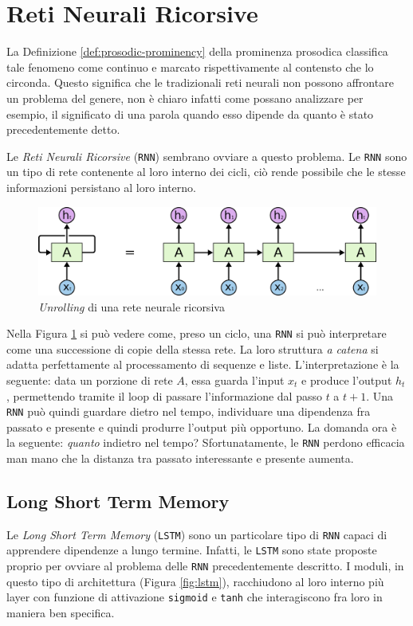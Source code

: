 \documentclass[twoside,twocolumn,11pt]{extarticle}
\theoremstyle{definition}
\begin{document}
\section{Reti Neurali Ricorsive}\label{sec:rnn}
	La Definizione \ref{def:prosodic-prominency} della prominenza prosodica classifica tale fenomeno come continuo e marcato rispettivamente al contensto che lo circonda. Questo significa che le tradizionali reti neurali non possono affrontare un problema del genere, non è chiaro infatti come possano analizzare per esempio, il significato di una parola quando esso dipende da quanto è stato precedentemente detto.
	
	Le \textit{Reti Neurali Ricorsive} (\texttt{RNN}) sembrano ovviare a questo problema. Le \texttt{RNN} sono un tipo di rete contenente al loro interno dei cicli, ciò rende possibile che le stesse informazioni persistano al loro interno.
	\begin{figure}[h]
		\centering
		\includegraphics[scale=.4]{img/rnn.png}
		\caption{\textit{Unrolling} di una rete neurale ricorsiva}
		\label{fig:unroll}
	\end{figure}
	Nella Figura \ref{fig:unroll} si può vedere come, preso un ciclo, una \texttt{RNN} si può interpretare come una successione di copie della stessa rete. La loro struttura \textit{a catena} si adatta perfettamente al processamento di sequenze e liste. L'interpretazione è la seguente: data un porzione di rete $A$, essa guarda l'input $x_t$ e produce l'output $h_t$, permettendo tramite il loop di passare l'informazione dal passo $t$ a $t + 1$. Una \texttt{RNN} può quindi guardare dietro nel tempo, individuare una dipendenza fra passato e presente e quindi produrre l'output più opportuno. La domanda ora è la seguente: \textit{quanto} indietro nel tempo? Sfortunatamente, le \texttt{RNN} perdono efficacia man mano che la distanza tra passato interessante e presente aumenta.
	
	\subsection{Long Short Term Memory}
		Le \textit{Long Short Term Memory} (\texttt{LSTM}) sono un particolare tipo di \texttt{RNN} capaci di apprendere dipendenze a lungo termine. Infatti, le \texttt{LSTM} sono state proposte proprio per ovviare al problema delle \texttt{RNN} precedentemente descritto. I moduli, in questo tipo di architettura (Figura \ref{fig:lstm}), racchiudono al loro interno più layer con funzione di attivazione \texttt{sigmoid} e \texttt{tanh} che interagiscono fra loro in maniera ben specifica.
		
\end{document}

